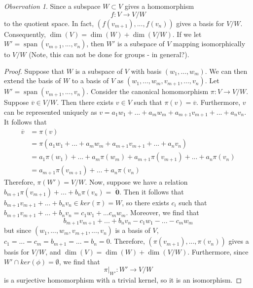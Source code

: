\documentclass[12pt]{article}
\theoremstyle{definition}
\theoremstyle{remark}
\newtheorem{obs}[thm]{Observation}
\numberwithin{equation}{section}
\newcommand\B[1]{\textbf{ #1}}
\DeclareMathOperator{\spn}{span}
\begin{document}
\begin{obs}
        Since a subspace $W \subset V$ gives a homomorphism \begin{equation}
                f:V\rightarrow V/W
        \end{equation}
        to the quotient space. In fact, $(f(v_{m+1}),...,f(v_n))$ gives a basis for $V/W$. Consequently, $\dim(V) = \dim(W) + \dim(V/W)$. If we let $W' = \spn(v_{m+1},...,v_n)$, then $W'$ is a subspace of $V$ mapping isomorphically to $V/W$ (Note, this can not be done for groups - in general?). 
\end{obs}
\begin{proof}
        Suppose that $W$ is a subspace of $V$ with basis $(w_1,...,w_m)$. We can then extend the basis of $W$ to a basis of $V$ as $(w_1,...,w_m,v_{m+1},...,v_n)$. Let $W' = \spn(v_{m+1},...,v_n)$. Consider the canonical homomorphism $\pi:V\rightarrow V/W$. Suppose $\overline{v} \in V/W$. Then there exists $v \in V$ such that $\pi(v) = \overline{v}$. Furthermore, $v$ can be represented uniquely as $v = a_1w_1+...+a_mw_m+a_{m+1}v_{m+1}+...+a_nv_n$. It follows that \begin{align*}
                \overline{v} &= \pi(v) \\
                &= \pi(a_1w_1+...+a_mw_m+a_{m+1}v_{m+1}+...+a_nv_n) \\
                &= a_1\pi(w_1)+...+a_m\pi(w_m)+a_{m+1}\pi(v_{m+1})+...+a_n\pi(v_n) \\
                &= a_{m+1}\pi(v_{m+1})+...+a_n\pi(v_n)
        \end{align*}
        Therefore, $\pi(W') = V/W$. Now, suppose we have a relation $b_{m+1}\pi(v_{m+1})+...+b_n\pi(v_n) = \overline{\B{0}}$. Then it follows that $b_{m+1}v_{m+1} + ... + b_nv_n \in ker(\pi) = W$, so there exists $c_i$ such that $b_{m+1}v_{m+1} + ... + b_nv_n = c_1w_1+...c_mw_m$. Moreover, we find that $$b_{m+1}v_{m+1} + ... + b_nv_n - c_1w_1-...-c_mw_m$$ but since $(w_1,...,w_m,v_{m+1},...,v_n)$ is a basis of $V$, $c_1 = ... = c_m = b_{m+1} = ... = b_n = 0$. Therefore, $(\pi(v_{m+1}),...,\pi(v_n))$ gives a basis for $V/W$, and $\dim(V) = \dim(W) + \dim(V/W)$. Furthermore, since $W' \cap ker(\phi) = \emptyset$, we find that \begin{equation}
                \pi\Big\vert_{W'}:W' \rightarrow V/W
        \end{equation}
        is a surjective homomorphism with a trivial kernel, so it is an isomorphism.
\end{proof}
\end{document}
